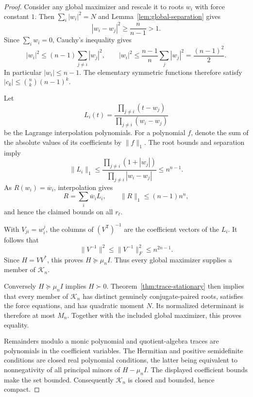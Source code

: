 \documentclass[11pt]{article}
\theoremstyle{remark}
\numberwithin{equation}{section}
\begin{document}
\begin{proof}
Consider any global maximizer and rescale it to roots $w_i$ with force
constant $1$.  Then $\sum_i|w_i|^2=N$ and
Lemma~\ref{lem:global-separation} gives
\[
 |w_i-w_j|^2\ge\frac n{n-1}>1.
\]
Since $\sum_iw_i=0$, Cauchy's inequality gives
\[
 |w_i|^2\le(n-1)\sum_{j\ne i}|w_j|^2,
 \qquad
 |w_i|^2\le\frac{n-1}{n}\sum_j|w_j|^2
       =\frac{(n-1)^2}{2}.
\]
In particular $|w_i|\le n-1$.
The elementary symmetric functions therefore satisfy
$|c_k|\le\binom nk(n-1)^k$.

Let
\[
 L_i(t)=\frac{\prod_{j\ne i}(t-w_j)}
                   {\prod_{j\ne i}(w_i-w_j)}
\]
be the Lagrange interpolation polynomials.  For a polynomial $f$, denote
the sum of the absolute values of its coefficients by $\|f\|_1$.
The root bounds and separation imply
\[
 \|L_i\|_1
 \le\frac{\prod_{j\ne i}(1+|w_j|)}
             {\prod_{j\ne i}|w_i-w_j|}
 \le n^{n-1}.
\]
As $R(w_i)=\overline w_i$, interpolation gives
\[
 R=\sum_i\overline w_iL_i,\qquad
 \|R\|_1\le(n-1)n^n,
\]
and hence the claimed bounds on all $r_\ell$.

With $V_{ji}=w_i^j$, the columns of $(V^{\mathsf T})^{-1}$ are the
coefficient vectors of the $L_i$.  It follows that
\[
 \|V^{-1}\|^2\le\|V^{-1}\|_F^2
 \le n^{2n-1}.
\]
Since $H=VV^*$, this proves $H\succeq\mu_n I$.
Thus every global maximizer supplies a member of $\mathcal K_n$.

Conversely $H\succeq\mu_n I$ implies $H\succ0$.
Theorem~\ref{thm:trace-stationary} then implies that every member of
$\mathcal K_n$ has distinct genuinely conjugate-paired roots, satisfies
the force equations, and has quadratic moment $N$.
Its normalized determinant is therefore at most $M_n$.
Together with the included global maximizer, this proves equality.

Remainders modulo a monic polynomial and quotient-algebra traces are
polynomials in the coefficient variables.  The Hermitian and positive
semidefinite conditions are closed real polynomial conditions, the latter
being equivalent to nonnegativity of all principal minors of
$H-\mu_n I$.  The displayed coefficient bounds make the set bounded.
Consequently $\mathcal K_n$ is closed and bounded, hence compact.
\end{proof}
\end{document}
